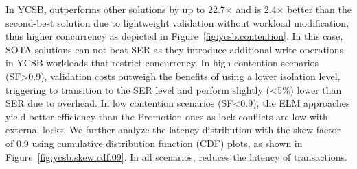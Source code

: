 In YCSB, \sysname outperforms other solutions by up to 22.7$\times$ and is 2.4$\times$ better than the second-best solution due to lightweight validation without workload modification, thus higher concurrency as depicted in Figure~\ref{fig:ycsb.contention}. In this case, SOTA solutions can not beat SER as they introduce additional write operations in YCSB workloads that restrict concurrency. In high contention scenarios (SF>0.9), validation costs outweigh the benefits of using a lower isolation level, triggering \sysname to transition to the SER level and perform slightly (<5\%) lower than SER due to \sysname overhead. %
In low contention scenarios (SF<0.9), the ELM approaches yield better efficiency than the Promotion ones as lock conflicts are low with external locks. 
We further analyze the latency distribution with the skew factor of 0.9 using cumulative distribution function (CDF) plots, as shown in Figure~\ref{fig:ycsb.skew.cdf.09}. In all scenarios, \sysname reduces the latency of transactions. 

